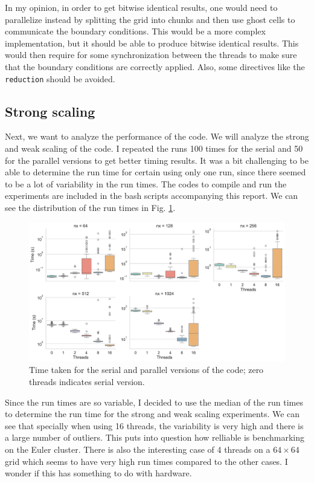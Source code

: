\documentclass[unicode,11pt,a4paper,oneside,numbers=endperiod,openany]{scrartcl}
\begin{document}
In my opinion, in order to get bitwise identical results, one
would need to parallelize instead by splitting the grid into chunks and then use
ghost cells to communicate the boundary conditions. This would be a more complex
implementation, but it should be able to produce bitwise identical results. This
would then require for some synchronization between the threads to make sure
that the boundary conditions are correctly applied. Also, some directives like
the \texttt{reduction} should be avoided.

\subsection*{Strong scaling}
Next, we want to analyze the performance of the code. We will analyze the strong
and weak scaling of the code. I repeated the runs 100 times for the serial and
50 for the parallel
versions to get better timing results.
It was a bit challenging to be able to determine the run time for certain using
only one run, since there seemed to be a lot of variability in the run times.
The codes to compile and run the experiments are included in the bash scripts
accompanying this report. We can see the distribution of the run times in Fig. \ref{im:times}.
\begin{figure}
    \centering
    \includegraphics[width=\textwidth]{../mini_app/data_var.pdf}
    \caption{Time taken for the serial and parallel versions of the code; zero threads indicates serial version.}
    \label{im:times}
\end{figure}
Since the run times are so variable, I decided to use the median of the run
times
to determine the run time for the strong and weak scaling experiments. We can
see that specially when using 16 threads, the variability is very high and there
is a large number of outliers. This puts into question how relliable is
benchmarking on the Euler cluster. There is also the interesting case of 4
threads on a $64\times64$ grid which seems to have very high run times compared
to the other cases. I wonder if this has something to do with hardware.
\end{document}
